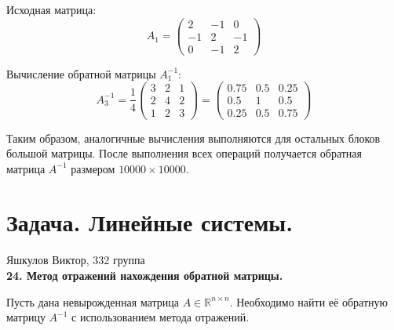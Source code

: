 \documentclass[14pt]{report}
\begin{document}
Исходная матрица:
\[
A_{1} = \begin{pmatrix}
2 & -1 & 0 \\
-1 & 2 & -1 \\
0 & -1 & 2
\end{pmatrix}
\]

Вычисление обратной матрицы \( A_{1}^{-1} \):
\[
A_3^{-1} = \frac{1}{4} \begin{pmatrix}
3 & 2 & 1 \\
2 & 4 & 2 \\
1 & 2 & 3
\end{pmatrix}
= \begin{pmatrix}
0.75 & 0.5 & 0.25 \\
0.5 & 1 & 0.5 \\
0.25 & 0.5 & 0.75
\end{pmatrix}
\]

Таким образом, аналогичные вычисления выполняются для остальных блоков большой матрицы. После выполнения всех операций получается обратная матрица \( A^{-1} \) размером \( 10000 \times 10000 \).\\

\newpage

\section*{Задача. Линейные системы.}
\hfill Яшкулов Виктор, 332 группа\\
\textbf{24. Метод отражений нахождения обратной матрицы.}

Пусть дана невырожденная матрица \( A \in \mathbb{R}^{n \times n} \). Необходимо найти её обратную матрицу \( A^{-1} \) с использованием метода отражений.
\end{document}

